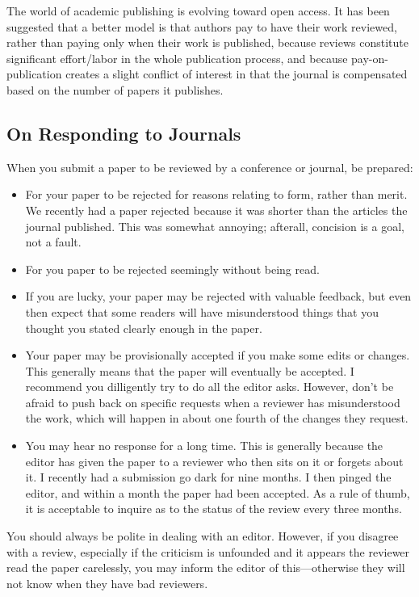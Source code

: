 \documentclass[
	fontsize=10pt, %
	twoside=false, %
	secnumdepth=1, %
]{kaobook}
\begin{document}
The world of academic publishing is evolving toward open access. It has been suggested that a better
model is that authors pay to have their work reviewed, rather than paying only when their work is published,
because reviews constitute significant effort/labor in the whole publication process, and because
pay-on-publication creates a slight conflict of interest in that the journal is compensated based on
the number of papers it publishes.

\subsection{On Responding to Journals}

When you submit a paper to be reviewed by a conference or journal, be prepared:
\begin{itemize}
\item For your paper to be rejected for reasons relating to form, rather than merit.
  We recently had a paper rejected because it was shorter than the articles the journal published. This was somewhat annoying; afterall, concision
  is a goal, not a fault.
\item For you paper to be rejected seemingly without being read.
\item If you are lucky, your paper may be rejected with valuable feedback, but even then expect that some readers will have misunderstood things that you
  thought you stated clearly enough in the paper.
\item Your paper may be provisionally accepted if you make some edits or changes. This generally means that the paper will eventually be accepted.
  I recommend you dilligently try to do all the editor asks. However, don't be afraid to push back on specific requests when a reviewer has
  misunderstood the work, which will happen in about one fourth of the changes they request.
\item You may hear no response for a long time. This is generally because the editor has given the paper to a reviewer
  who then sits on it or forgets about it. I recently had a submission go dark for nine months.
  I then pinged the editor, and within a month the paper had been accepted. As a rule of thumb, it
  is acceptable to inquire as to the status of the review every three months.
\end{itemize}
You should always be polite in dealing with an editor. However, if you disagree with a review, especially if the criticism is unfounded
and it appears the reviewer read the paper carelessly, you may inform the editor of this---otherwise they will not know when they have bad reviewers.
\end{document}
